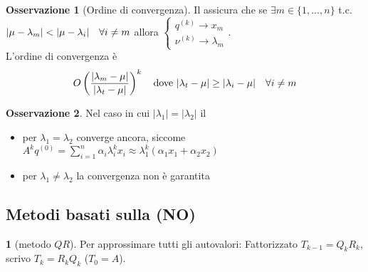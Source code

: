 \documentclass[a4paper,10pt]{article}
\theoremstyle{definition}
\theoremstyle{indentdefinition}
\theoremstyle{indenttheorem}
\theoremstyle{myremark}
\newtheorem*{rem*}{Osservazione}
\theoremstyle{indentgeneral}
\newtheorem{lyxalgorithm}[thm]{\protect\algorithmname}
\theoremstyle{plain}
\theoremstyle{plain}
\begin{document}
\begin{rem*}[Ordine di convergenza]
Il  assicura che se $\exists m\in\{1,\dots,n\}$ t.c. $\abs{\mu-\lambda_m}<\abs{\mu-\lambda_i}\quad \forall i\ne m$ allora $\begin{cases}
    q^{(k)}\to x_m \\
    \nu^{(k)}\to\lambda_m
\end{cases}$.\\
L'ordine di convergenza è $$O\left(\frac{\abs{\lambda_m-\mu}}{\abs{\lambda_t-\mu}}\right)^k \quad \text{dove }\abs{\lambda_t-\mu}\ge \abs{\lambda_i-\mu}\quad \forall i\ne m$$
\end{rem*}

\begin{rem*}
Nel caso in cui $\left|\lambda_{1}\right|=\left|\lambda_{2}\right|$
il 
\end{rem*}
\begin{itemize}
\item per $\lambda_{1}=\lambda_{2}$ converge ancora, siccome $A^{k}q^{\left(0\right)}=\sum_{i=1}^{n}\alpha_{i}\lambda_{i}^{k}x_{i}\approx\lambda_{1}^{k}\left(\alpha_{1}x_{1}+\alpha_{2}x_{2}\right)$
\item per $\lambda_{1}\neq\lambda_{2}$ la convergenza non è garantita
\end{itemize}

\subsection{Metodi basati sulla  (NO)}
\begin{lyxalgorithm}[metodo $QR$] Per approssimare tutti gli autovalori:
\label{alg:metodo-QR}Fattorizzato $T_{k-1}=Q_{k}R_{k}$, scrivo
$T_{k}=R_{k}Q_{k}$ ($T_{0}=A$).
\end{lyxalgorithm}
\end{document}
